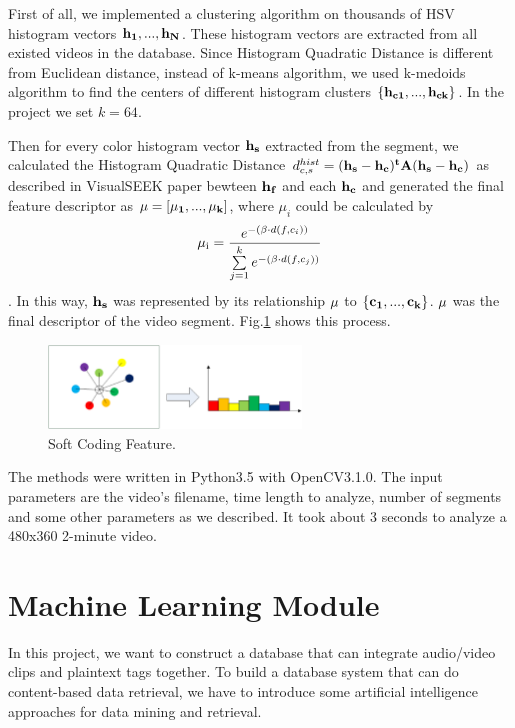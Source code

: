 \documentclass{report}
\begin{document}
First of all, we implemented a clustering algorithm on thousands of HSV histogram vectors ${\bf{h}_1, ...,  \bf{h}_N}$. These histogram vectors are extracted from all existed videos in the database. Since Histogram Quadratic Distance is different from Euclidean distance, instead of k-means algorithm, we used k-medoids algorithm to find the centers of different histogram clusters $\{\bf{h}_{c1},...,\bf{h}_{ck}\}$. In the project we set $k = 64$.

Then for every color histogram vector ${\bf{h}_s}$ extracted from the segment, we calculated the Histogram Quadratic Distance $d^{hist}_{c,s} = (\bf{h}_s - \bf{h}_c)^t\bf{A}(\bf{h}_s - \bf{h}_c)$ as described in VisualSEEK paper bewteen ${\bf{h}_f}$ and each $\bf{h}_c$ and generated the final feature descriptor as $\bf{\mu}=[\mu_1,...,\mu_k]$, where $\mu_i$ could be calculated by
\[{\mu _{\rm{i}}} = \frac{{{e^{ - \left( {\beta  \cdot d(f,{c_i})} \right)}}}}{{\sum\limits_{j = 1}^k {{e^{ - \left( {\beta  \cdot d(f,{c_j})} \right)}}} }}\].
In this way, ${\bf{h}_s}$ was represented by its relationship $\bf{\mu}$ to $\{\bf{c}_1,...,\bf{c}_k\}$. $\bf{\mu}$ was the final descriptor of the video segment. Fig.\ref{fig:coding} shows this process.

\begin{figure}[htb]
\centering
\includegraphics[width=0.6\textwidth]{coding.eps}
\caption{Soft Coding Feature.}
\label{fig:coding}
\end{figure}

The methods were written in Python3.5 with OpenCV3.1.0. The input parameters are the video's filename, time length to analyze, number of segments and some other parameters as we described. It took about 3 seconds to analyze a 480x360 2-minute video.

\section{Machine Learning Module}

In this project, we want to construct a database that can integrate audio/video clips and plaintext tags together. To build a database system that can do content-based data retrieval, we have to introduce some artificial intelligence approaches for data mining and retrieval.
\end{document}
